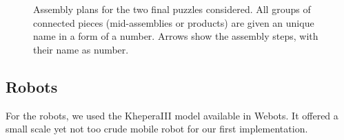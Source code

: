 			\begin{figure}[h!]
				\centering
				\; %
				\caption{Assembly plans for the two final puzzles considered. All groups of connected pieces (mid-assemblies or products) are given an unique name in a form of a number. Arrows show the assembly steps, with their name as number.}
			\label{fig:assembly_plans} %
			\end{figure}

			
	
	\subsection{Robots} %
	\label{sub:robots}
	For the robots, we used the KheperaIII model available in Webots. It offered a small scale yet not too crude mobile robot for our first implementation.
	
